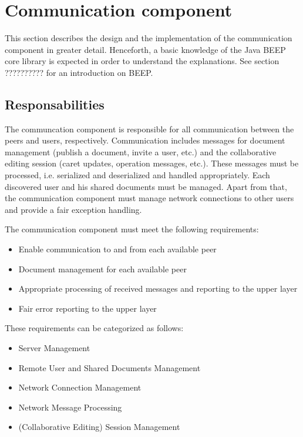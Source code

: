 

\section{Communication component}
This section describes the design and the implementation of the communication component in greater detail. Henceforth, a basic knowledge of the Java BEEP core library is expected in order to understand the explanations. See section ?????????? for an introduction on BEEP.

\subsection{Responsabilities}
The communcation component is responsible for all communication between the peers and users, respectively. Communication includes messages for document management (publish a document, invite a user, etc.) and the collaborative editing session (caret updates, operation messages, etc.). These messages must be processed, i.e. serialized and deserialized and handled appropriately. Each discovered user and his shared documents must be managed. 
Apart from that, the communication component must manage network connections to other users and provide a fair exception handling.

The communication component must meet the following requirements:

\begin{itemize}
 \item Enable communication to and from each available peer
 \item Document management for each available peer
 \item Appropriate processing of received messages and reporting to the upper layer
 \item Fair error reporting to the upper layer
\end{itemize}

These requirements can be categorized as follows:

\begin{itemize}
 \item Server Management
 \item Remote User and Shared Documents Management
 \item Network Connection Management
 \item Network Message Processing
 \item (Collaborative Editing) Session Management
\end{itemize}

